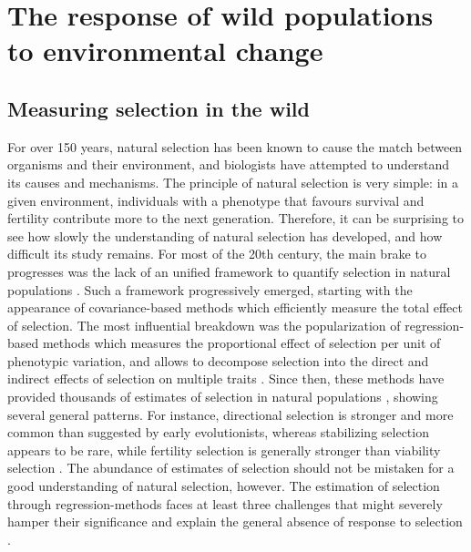 \section{The response of wild populations to environmental change}
\subsection{Measuring selection in the wild}
For over 150 years, natural selection has been known to cause the match between organisms and their environment, and biologists have attempted to understand its causes and mechanisms. The principle of natural selection is very simple: in a given environment, individuals with a phenotype that favours survival and fertility contribute more to the next generation. Therefore, it can be surprising to see how slowly the understanding of natural selection has developed, and how difficult its study remains. 
For most of the 20th century, the main brake to progresses was the lack of an unified framework to quantify selection in natural populations \parencite{Wade2006}. Such a framework progressively emerged, starting with the appearance of covariance-based methods \parencite{Robertson1966, Price1970} which efficiently measure the total effect of selection. The most influential breakdown was the popularization of regression-based methods \parencite{Lande1979,Lande1983} which measures the proportional effect of selection per unit of phenotypic variation, and allows to decompose selection into the direct and indirect effects of selection on multiple traits \parencite{Broodie1995}.
Since then, these methods have provided thousands of estimates of selection in natural populations \parencite{Kingsolver2001,Stinchcombe2008,Kingsolver2012}, showing several general patterns. For instance, directional selection is stronger and more common than suggested by early evolutionists, whereas stabilizing selection appears to be rare, while fertility selection is generally stronger than viability selection \parencite{Kingsolver2012}.
The abundance of estimates of selection should not be mistaken for a good understanding of natural selection, however. The estimation of selection through regression-methods faces at least three challenges that might severely hamper their significance and explain the general absence of response to selection \parencite{Merila2001, Brookfield2016}.

